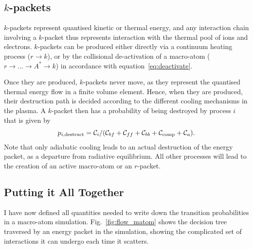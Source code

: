 \subsection{$k$-packets}
$k$-packets represent quantised kinetic or thermal energy, and any interaction
chain involving a $k$-packet thus represents interaction with the thermal
pool of ions and electrons. $k$-packets can be produced either directly
via a continuum heating process ($r \rightarrow k$), 
or by the collisional de-activation of a macro-atom 
($r \rightarrow \ldots \rightarrow A^* \rightarrow k$) in accordance with
equation~\ref{eq:deactivate}. 

Once they are produced, $k$-packets never move, as they represent the quantised
thermal energy flow in a finite volume element. Hence, when they are produced,
their destruction path is decided according to the different cooling mechanisms
in the plasma. A $k$-packet then has a probability of being destroyed by process $i$ that
is given by
\begin{equation}
p_{i,\mathrm{destruct}} = {\cal C}_i / ({\cal C}_{bf} + {\cal C}_{ff} + {\cal C}_{bb} + {\cal C}_{\mathrm{comp}} + {\cal C}_a).
\end{equation}
Note that only adiabatic cooling leads to an actual destruction of the energy packet,
as a departure from radiative equilibrium. All other processes will lead to the 
creation of an active macro-atom or an $r$-packet.



\subsection{Putting it All Together}

I have now defined all quantities needed to write down the transition 
probabilities in a macro-atom simulation. Fig.~\ref{fig:flow_matom}
shows the decision tree traversed by an energy packet in the simulation,
showing the complicated set of interactions it can undergo each time it 
scatters.

